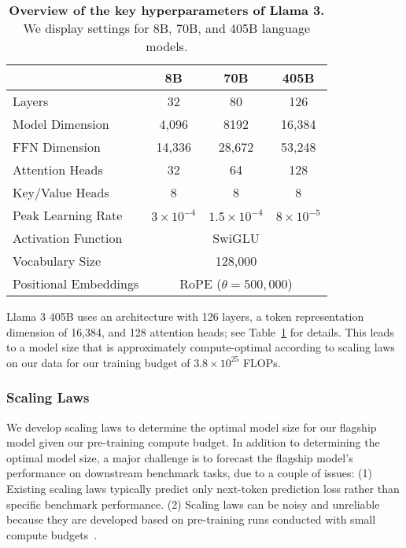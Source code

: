 \begin{table}[]
	\centering
	\begin{tabular}{l|ccc}
	\toprule
	                      & \textbf{8B}  & \textbf{70B}  & \textbf{405B}\\
	\midrule
	Layers       & 32           & 80            & 126         \\
	Model Dimension   & 4,096         & 8192          & 16,384       \\
	FFN Dimension        &     14,336         &      28,672         &    53,248      \\
	Attention Heads    & 32           & 64            & 128         \\
	Key/Value Heads       & 8            & 8             & 8           \\
	Peak Learning Rate    & $3 \times 10^{-4}$         & $1.5  \times 10^{-4}$       & $8 \times 10^{-5}$        \\
	Activation Function   & \multicolumn{3}{c}{SwiGLU}                 \\
	Vocabulary Size       & \multicolumn{3}{c}{128,000}                   \\
	Positional Embeddings & \multicolumn{3}{c}{RoPE ($\theta=500,000$)} \\
	\bottomrule
	\end{tabular}
	\caption{\textbf{Overview of the key hyperparameters of Llama 3.} We display settings for 8B, 70B, and 405B language models.}
	\label{table:overview_model_hyperparams}
\end{table}

Llama 3 405B uses an architecture with 126 layers, a token representation dimension of 16,384, and 128 attention heads; see Table~\ref{table:overview_model_hyperparams} for details.
This leads to a model size that is approximately compute-optimal according to scaling laws on our data for our training budget of $3.8 \times 10^{25}$ FLOPs.

\subsubsection{Scaling Laws}
\label{section:scaling_law}

We develop scaling laws \citep{hoffmann2022chinchilla,kaplan2020scaling} to determine the optimal model size for our flagship model given our pre-training compute budget.
In addition to determining the optimal model size, a major challenge is to forecast the flagship model's performance on downstream benchmark tasks, due to a couple of issues: (1) Existing scaling laws typically predict only next-token prediction loss rather than specific benchmark performance.
(2)  Scaling laws can be noisy and unreliable because they are developed based on pre-training runs conducted with small compute budgets~\citep{wei2022emergent}.

